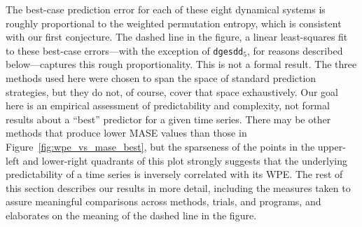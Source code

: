 The best-case prediction error for each of these eight dynamical
systems is roughly proportional to the weighted permutation entropy,
which is consistent with our first conjecture.  The dashed line in the
figure, a linear least-squares fit to these best-case errors---with
the exception of {\tt dgesdd$_5$}, for reasons described
below---captures this rough proportionality.  This is not a formal
result.  The three methods used here were chosen to span the space of
standard prediction strategies, but they do not, of course, cover that
space exhaustively.  Our goal here is an empirical assessment of
predictability and complexity, not formal results about a ``best''
predictor for a given time series.  There may be other methods that
produce lower MASE values than those in
Figure~\ref{fig:wpe_vs_mase_best}, but the sparseness of the points in
the upper-left and lower-right quadrants of this plot strongly
suggests that the underlying predictability of a time series is
inversely correlated with its WPE.  The rest of this section describes
our results in more detail, including the measures taken to assure
meaningful comparisons across methods, trials, and programs, and
elaborates on the meaning of the dashed line in the figure.


